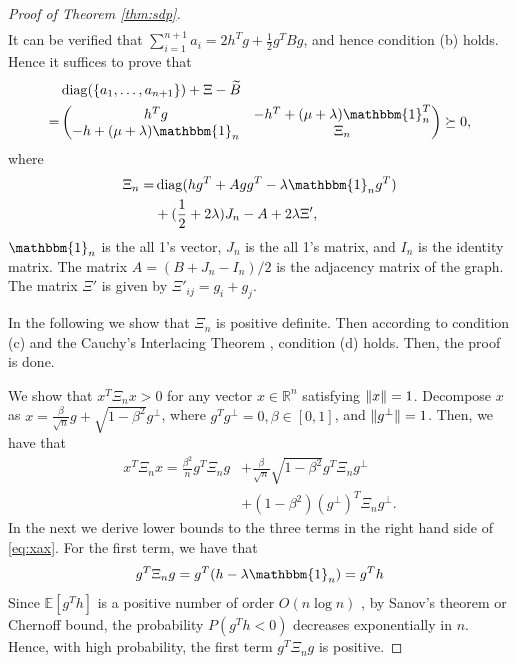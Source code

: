 \documentclass[conference]{IEEEtran}
\DeclarePairedDelimiter\norm{\lVert}{\rVert}
\DeclareMathOperator{\diag}{diag}
\begin{document}
\begin{proof}[Proof of Theorem \ref{thm:sdp}]
\begin{align}
	\end{align}
	It can be verified that $\sum_{i=1}^{n+1} a_i = 2h^Tg +\frac{1}{2} g^T B g$, and hence condition (b) holds.
	Hence it suffices to prove that
	\begin{align}
		&\diag(\{a_1, \dots, a_{n+1}\}) + \Xi - \widetilde{B} \nonumber\\
		=& \begin{pmatrix} h^T g & -h^T +(\mu + \lambda)\mathbbm{1}_n^T \\
			-h+(\mu + \lambda )\mathbbm{1}_n & \Xi_n \end{pmatrix}
		\succeq 0, 
	\end{align}
	where
	\begin{align}\label{eq:Xi_n}
		\Xi_n =&\diag(hg^T + Agg^T -\lambda \mathbbm{1}_ng^T)  \nonumber\\
		&+ (\frac{1}{2} +2\lambda) J_n  - A + 2\lambda \Xi',
	\end{align}
	$\mathbbm{1}_n$ is the all 1's vector, $J_n$ is the all 1's matrix, and $I_n$ is the identity matrix. The matrix $A=(B+J_n-I_n)/2$ is the adjacency matrix of the graph.
	The matrix $\Xi'$ is given by $\Xi'_{ij}=g_i + g_j$.
	
	In the following we show that $\Xi_n$ is positive definite. Then according to condition (c) and the
	Cauchy's Interlacing Theorem \cite{hwang}, condition (d) holds.
	Then, the proof is done.
	
	We show that $x^T \Xi_n x>0$ for any vector $x \in \mathbb{R}^n$ satisfying $\norm{x}=1$. Decompose $x$ as $x=\frac{\beta}{\sqrt{n}} g
	+ \sqrt{1-\beta^2} g^{\perp}$, where $g^Tg^{\perp}=0, \beta \in [0,1]$, and $\norm{g^{\perp}}=1$. Then, we have that 
	\begin{align}
		x^T \Xi_n x = \frac{\beta^2}{n} g^T \Xi_n g  &
		+		\frac{\beta}{\sqrt{n}}\sqrt{1-\beta^2} g^T \Xi_n g^{\perp}
		\nonumber\\\label{eq:xax}
		&+
		(1-\beta^2)(g^{\perp})^T \Xi_n g^{\perp}. 
	\end{align}
	In the next we derive lower bounds to the three terms in the right hand side of \eqref{eq:xax}.
	For the first term, we have that
	\begin{align*}
		g^T \Xi_n g = g^T(h -\lambda \mathbbm{1}_n)   = g^T h
	\end{align*}
	Since $\mathbb{E}[g^T h]$ is a positive number of order $O(n\log n)$ ,
	by Sanov's theorem or Chernoff bound, the probability 
	$P(g^T h < 0)$ decreases exponentially in $n$. Hence, with high probability, the first term $g^T \Xi_n g$ is positive.
	

\end{proof}
\end{document}
